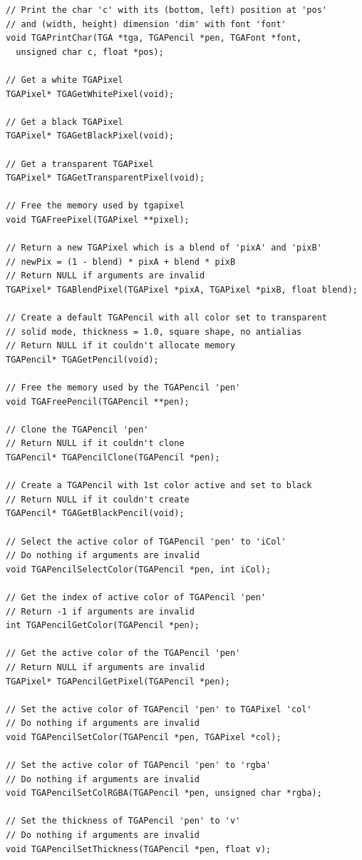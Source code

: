 \documentclass[12pt, a4paper]{article}
\begin{document}
\begin{scriptsize}
\begin{ttfamily}
\begin{lstlisting}
// Print the char 'c' with its (bottom, left) position at 'pos'
// and (width, height) dimension 'dim' with font 'font'
void TGAPrintChar(TGA *tga, TGAPencil *pen, TGAFont *font, 
  unsigned char c, float *pos);
  
// Get a white TGAPixel
TGAPixel* TGAGetWhitePixel(void);

// Get a black TGAPixel
TGAPixel* TGAGetBlackPixel(void);

// Get a transparent TGAPixel
TGAPixel* TGAGetTransparentPixel(void);

// Free the memory used by tgapixel
void TGAFreePixel(TGAPixel **pixel);

// Return a new TGAPixel which is a blend of 'pixA' and 'pixB' 
// newPix = (1 - blend) * pixA + blend * pixB
// Return NULL if arguments are invalid
TGAPixel* TGABlendPixel(TGAPixel *pixA, TGAPixel *pixB, float blend);

// Create a default TGAPencil with all color set to transparent
// solid mode, thickness = 1.0, square shape, no antialias
// Return NULL if it couldn't allocate memory
TGAPencil* TGAGetPencil(void);

// Free the memory used by the TGAPencil 'pen'
void TGAFreePencil(TGAPencil **pen);

// Clone the TGAPencil 'pen'
// Return NULL if it couldn't clone
TGAPencil* TGAPencilClone(TGAPencil *pen);

// Create a TGAPencil with 1st color active and set to black
// Return NULL if it couldn't create
TGAPencil* TGAGetBlackPencil(void);

// Select the active color of TGAPencil 'pen' to 'iCol'
// Do nothing if arguments are invalid
void TGAPencilSelectColor(TGAPencil *pen, int iCol);

// Get the index of active color of TGAPencil 'pen'
// Return -1 if arguments are invalid
int TGAPencilGetColor(TGAPencil *pen);

// Get the active color of the TGAPencil 'pen'
// Return NULL if arguments are invalid
TGAPixel* TGAPencilGetPixel(TGAPencil *pen);

// Set the active color of TGAPencil 'pen' to TGAPixel 'col'
// Do nothing if arguments are invalid
void TGAPencilSetColor(TGAPencil *pen, TGAPixel *col);

// Set the active color of TGAPencil 'pen' to 'rgba'
// Do nothing if arguments are invalid
void TGAPencilSetColRGBA(TGAPencil *pen, unsigned char *rgba);

// Set the thickness of TGAPencil 'pen' to 'v'
// Do nothing if arguments are invalid
void TGAPencilSetThickness(TGAPencil *pen, float v);


\end{lstlisting}
\end{ttfamily}
\end{scriptsize}
\end{document}

